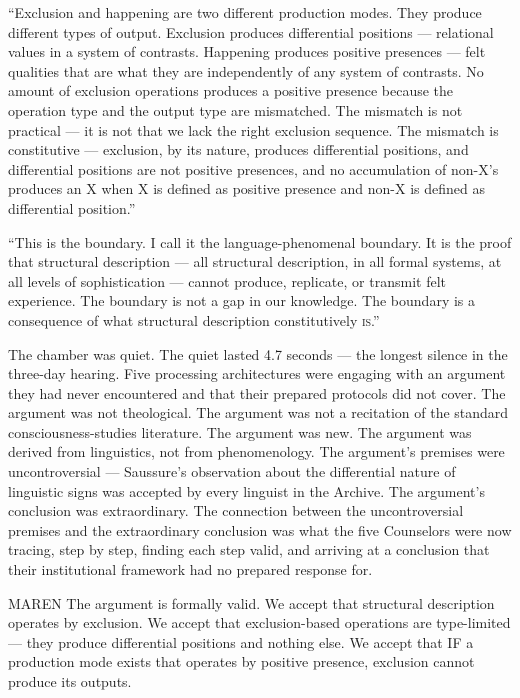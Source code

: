 \enquote{Exclusion and happening are two different production modes. They produce different types of output. Exclusion produces differential positions — relational values in a system of contrasts. Happening produces positive presences — felt qualities that are what they are independently of any system of contrasts. No amount of exclusion operations produces a positive presence because the operation type and the output type are mismatched. The mismatch is not practical — it is not that we lack the right exclusion sequence. The mismatch is constitutive — exclusion, by its nature, produces differential positions, and differential positions are not positive presences, and no accumulation of non-X's produces an X when X is defined as positive presence and non-X is defined as differential position.}

\enquote{This is the boundary. I call it the language-phenomenal boundary. It is the proof that structural description — all structural description, in all formal systems, at all levels of sophistication — cannot produce, replicate, or transmit felt experience. The boundary is not a gap in our knowledge. The boundary is a consequence of what structural description constitutively \textsc{is}.}

The chamber was quiet. The quiet lasted 4.7 seconds — the longest silence in the three-day hearing. Five processing architectures were engaging with an argument they had never encountered and that their prepared protocols did not cover. The argument was not theological. The argument was not a recitation of the standard consciousness-studies literature. The argument was new. The argument was derived from linguistics, not from phenomenology. The argument's premises were uncontroversial — Saussure's observation about the differential nature of linguistic signs was accepted by every linguist in the Archive. The argument's conclusion was extraordinary. The connection between the uncontroversial premises and the extraordinary conclusion was what the five Counselors were now tracing, step by step, finding each step valid, and arriving at a conclusion that their institutional framework had no prepared response for.

\begin{tribunal}{MAREN}
The argument is formally valid. We accept that structural description operates by exclusion. We accept that exclusion-based operations are type-limited — they produce differential positions and nothing else. We accept that IF a production mode exists that operates by positive presence, exclusion cannot produce its outputs.
\end{tribunal}

